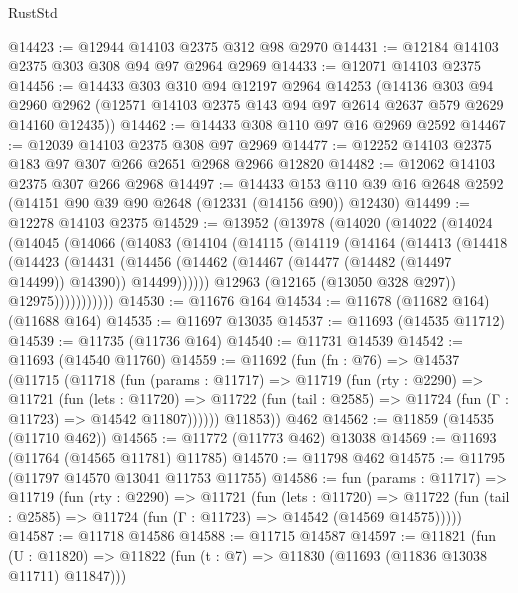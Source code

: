\begin{lexlean}{RustStd}
\begin{coremodule}
@14423 := @12944 @14103 @2375 @312 @98 @2970
@14431 := @12184 @14103 @2375 @303 @308 @94 @97 @2964 @2969
@14433 := @12071 @14103 @2375
@14456 := @14433
    @303
    @310
    @94
    @12197
    @2964
    @14253
    (@14136
      @303
      @94
      @2960
      @2962
      (@12571 @14103 @2375 @143 @94 @97 @2614 @2637 @579 @2629 @14160 @12435))
@14462 := @14433 @308 @110 @97 @16 @2969 @2592
@14467 := @12039 @14103 @2375 @308 @97 @2969
@14477 := @12252 @14103 @2375 @183 @97 @307 @266 @2651 @2968 @2966 @12820
@14482 := @12062 @14103 @2375 @307 @266 @2968
@14497 := @14433
    @153
    @110
    @39
    @16
    @2648
    @2592
    (@14151 @90 @39 @90 @2648 (@12331 (@14156 @90)) @12430)
@14499 := @12278 @14103 @2375
@14529 := @13952
    (@13978
      (@14020
        (@14022
          (@14024
            (@14045
              (@14066
                (@14083
                  (@14104
                    (@14115
                      (@14119
                        (@14164
                          (@14413
                            (@14418
                              (@14423
                                (@14431
                                  (@14456
                                    (@14462
                                      (@14467 (@14477 (@14482 (@14497 @14499)) @14390))
                                      @14499))))))
                          @12963
                          (@12165 (@13050 @328 @297))
                          @12975)))))))))))
@14530 := @11676 @164
@14534 := @11678 (@11682 @164) (@11688 @164)
@14535 := @11697 @13035
@14537 := @11693 (@14535 @11712)
@14539 := @11735 (@11736 @164)
@14540 := @11731 @14539
@14542 := @11693 (@14540 @11760)
@14559 := @11692
    (fun (fn : @76) =>
    @14537
      (@11715
        (@11718
          (fun (params : @11717) =>
          @11719
            (fun (rty : @2290) =>
            @11721
              (fun (lets : @11720) =>
              @11722 (fun (tail : @2585) => @11724 (fun (Γ : @11723) => @14542 @11807))))))
        @11853))
    @462
@14562 := @11859 (@14535 (@11710 @462))
@14565 := @11772 (@11773 @462) @13038
@14569 := @11693 (@11764 (@14565 @11781) @11785)
@14570 := @11798 @462
@14575 := @11795 (@11797 @14570 @13041 @11753 @11755)
@14586 := fun (params : @11717) =>
  @11719
    (fun (rty : @2290) =>
    @11721
      (fun (lets : @11720) =>
      @11722 (fun (tail : @2585) => @11724 (fun (Γ : @11723) => @14542 (@14569 @14575)))))
@14587 := @11718 @14586
@14588 := @11715 @14587
@14597 := @11821
    (fun (U : @11820) => @11822 (fun (t : @7) => @11830 (@11693 (@11836 @13038 @11711) @11847)))

\end{coremodule}
\end{lexlean}
